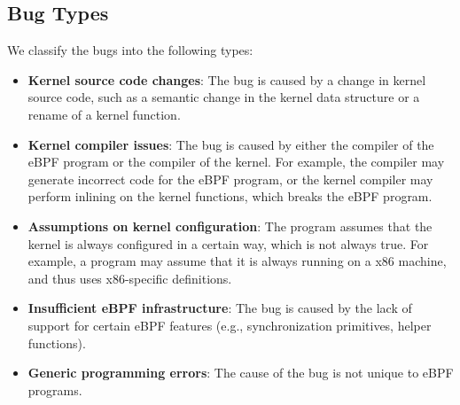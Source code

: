 



\subsection{Bug Types}
We classify the bugs into the following types:
\begin{itemize}
  \item \textbf{Kernel source code changes}:
        The bug is caused by a change in kernel source code, such as a semantic change in the kernel data structure or a rename of a kernel function.
  \item \textbf{Kernel compiler issues}:
        The bug is caused by either the compiler of the eBPF program or the compiler of the kernel. For example, the compiler may generate incorrect code for the eBPF program, or the kernel compiler may perform inlining on the kernel functions, which breaks the eBPF program.
  \item \textbf{Assumptions on kernel configuration}:
        The program assumes that the kernel is always configured in a certain way, which is not always true. For example, a program may assume that it is always running on a x86 machine, and thus uses x86-specific definitions.
  \item \textbf{Insufficient eBPF infrastructure}:
        The bug is caused by the lack of support for certain eBPF features (e.g., synchronization primitives, helper functions).
  \item \textbf{Generic programming errors}:
        The cause of the bug is not unique to eBPF programs.
\end{itemize}

